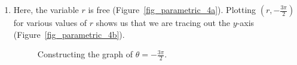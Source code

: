 \begin{example}
\begin{enumerate}
\item  Here, the variable $r$ is free (Figure~\ref{fig_parametric_4a}).  Plotting $\left(r, -\frac{3\pi}{2}\right)$ for various values of $r$ shows us that we are tracing out the $y$-axis (Figure~\ref{fig_parametric_4b}).

\begin{figure}[H]
\centering
\centerline{
\hspace{0.1cm}
}
\caption{Constructing the graph of $\theta  = -\frac{3\pi}{2}$. }

\end{figure}

\end{enumerate}
\end{example}


